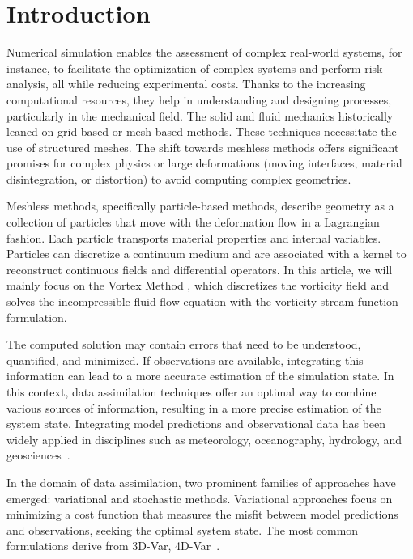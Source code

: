 
\section{Introduction}


Numerical simulation enables the assessment of complex real-world systems, for instance, to facilitate the optimization of complex systems and perform risk analysis, all while reducing experimental costs. Thanks to the increasing computational resources, they help in understanding and designing processes, particularly in the mechanical field.
The solid and fluid mechanics historically leaned on grid-based or mesh-based methods. These techniques necessitate the use of structured meshes. The shift towards meshless methods offers significant promises for complex physics or large deformations (moving interfaces, material disintegration, or distortion) to avoid computing complex geometries.

Meshless methods, specifically particle-based methods, describe geometry as a collection of particles that move with the deformation flow in a Lagrangian fashion. Each particle transports material properties and internal variables. Particles can discretize a continuum medium and are associated with a kernel to reconstruct continuous fields and differential operators. In this article, we will mainly focus on the Vortex Method \cite{cottet_vortex_2000,mimeau_review_2021}, which discretizes the vorticity field and solves the incompressible fluid flow equation with the vorticity-stream function formulation.
\newline

The computed solution may contain errors that need to be understood, quantified, and minimized. If observations are available, integrating this information can lead to a more accurate estimation of the simulation state. In this context, data assimilation techniques offer an optimal way to combine various sources of information, resulting in a more precise estimation of the system state. Integrating model predictions and observational data has been widely applied in disciplines such as meteorology, oceanography, hydrology, and geosciences~\cite{bocquet_introduction_2014}.

In the domain of data assimilation, two prominent families of approaches have emerged: variational and stochastic methods. Variational approaches \cite{variational_method} focus on minimizing a cost function that measures the misfit between model predictions and observations, seeking the optimal system state. The most common formulations derive from 3D-Var, 4D-Var~\cite{talagrand1997assimilation}.

